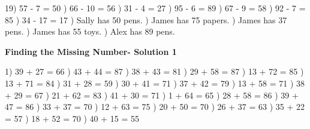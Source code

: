 \documentclass{article}%
\begin{document}
19) 57 {-} 7 = 50%
) 66 {-} 10 = 56%
) 31 {-} 4 = 27%
) 95 {-} 6 = 89%
) 67 {-} 9 = 58%
) 92 {-} 7 = 85%
) 34 {-} 17 = 17%
) Sally has 50 pens.%
) James has 75 papers.%
) James has 37 pens.%
) James has 55 toys.%
) Alex has 89 pens.%
\newline%
\newpage%
\large%
\begin{center}%
\textbf{Finding the Missing Number- Solution 1}%
\newline%
\end{center} \normalsize%
1) 39 + 27 = 66%
) 43 + 44 = 87%
) 38 + 43 = 81%
) 29 + 58 = 87%
) 13 + 72 = 85%
) 13 + 71 = 84%
) 31 + 28 = 59%
) 30 + 41 = 71%
) 37 + 42 = 79%
) 13 + 58 = 71%
) 38 + 29 = 67%
) 21 + 62 = 83%
) 41 + 30 = 71%
) 1 + 64 = 65%
) 28 + 58 = 86%
) 39 + 47 = 86%
) 33 + 37 = 70%
) 12 + 63 = 75%
) 20 + 50 = 70%
) 26 + 37 = 63%
) 35 + 22 = 57%
) 18 + 52 = 70%
) 40 + 15 = 55%
\newline%
\end{document}
